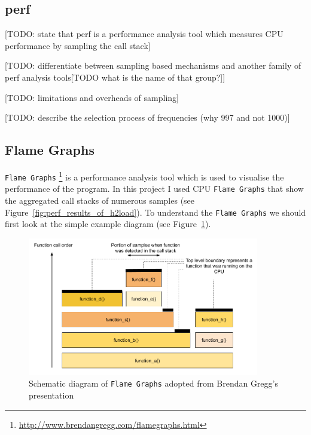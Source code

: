 \documentclass[12pt,a4paper,twoside,openright]{report}
\begin{document}
\subsection{perf}
[TODO: state that perf is a performance analysis tool which measures CPU performance by sampling the call stack]


[TODO: differentiate between sampling based mechanisms and another family of perf analysis tools[TODO what is the name of that group?]]

[TODO: limitations and overheads of sampling]

[TODO: describe the selection process of frequencies (why 997 and not 1000)]



\subsection{Flame Graphs}
\texttt{Flame Graphs} \footnote{\url{http://www.brendangregg.com/flamegraphs.html}} is a performance analysis tool which is used to visualise the performance of the program.
In this project I used CPU \texttt{Flame Graphs} that show the aggregated call stacks of numerous samples (see Figure~\ref{fig:perf_results_of_h2load}).
To understand the \texttt{Flame Graphs} we should first look at the simple example diagram (see Figure~\ref{fig:Flame_Graphs_explanation}).

    \begin{figure}[H]
    \centering
    \includegraphics[width=0.9\textwidth]{figs/Flame_Graphs_explanation.png}
    \caption{Schematic diagram of \texttt{Flame Graphs} adopted from Brendan Gregg's presentation \cite{USENIX_ATC2017_flamegraphs}}
    \label{fig:Flame_Graphs_explanation}
    \end{figure}
\end{document}
